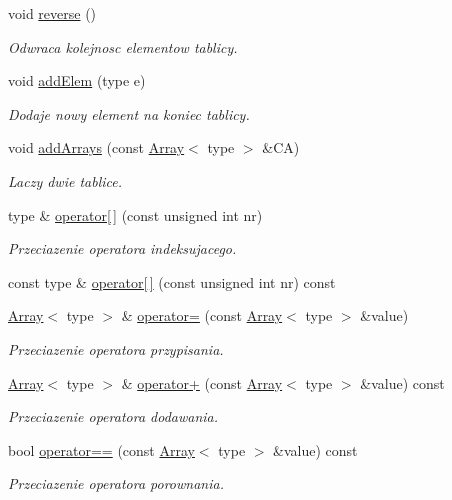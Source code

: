 \begin{DoxyCompactItemize}
void \hyperlink{class_array_afdcea945751f954e5d978f3845939bd4}{reverse} ()
\begin{DoxyCompactList}\small\item\em Odwraca kolejnosc elementow tablicy. \end{DoxyCompactList}\item 
void \hyperlink{class_array_ad57a599a8ff2c1d502ef8d7d309cc316}{add\-Elem} (type e)
\begin{DoxyCompactList}\small\item\em Dodaje nowy element na koniec tablicy. \end{DoxyCompactList}\item 
void \hyperlink{class_array_aa9091edbef604b69bb919908ff5d25f2}{add\-Arrays} (const \hyperlink{class_array}{Array}$<$ type $>$ \&C\-A)
\begin{DoxyCompactList}\small\item\em Laczy dwie tablice. \end{DoxyCompactList}\item 
type \& \hyperlink{class_array_aaffe48273ef363811e4281d3c98f54ab}{operator\mbox{[}$\,$\mbox{]}} (const unsigned int nr)
\begin{DoxyCompactList}\small\item\em Przeciazenie operatora indeksujacego. \end{DoxyCompactList}\item 
const type \& \hyperlink{class_array_a35b84fdc5667252256427106e0df873d}{operator\mbox{[}$\,$\mbox{]}} (const unsigned int nr) const 
\item 
\hyperlink{class_array}{Array}$<$ type $>$ \& \hyperlink{class_array_a264035df373bcf3e05339511a7252897}{operator=} (const \hyperlink{class_array}{Array}$<$ type $>$ \&value)
\begin{DoxyCompactList}\small\item\em Przeciazenie operatora przypisania. \end{DoxyCompactList}\item 
\hyperlink{class_array}{Array}$<$ type $>$ \& \hyperlink{class_array_a6a1a5e53b3e1774c118667216f4134b8}{operator+} (const \hyperlink{class_array}{Array}$<$ type $>$ \&value) const 
\begin{DoxyCompactList}\small\item\em Przeciazenie operatora dodawania. \end{DoxyCompactList}\item 
bool \hyperlink{class_array_ad52b3c353c90ed68e9d5be7b5c4b04b4}{operator==} (const \hyperlink{class_array}{Array}$<$ type $>$ \&value) const 
\begin{DoxyCompactList}\small\item\em Przeciazenie operatora porownania. \end{DoxyCompactList}\end{DoxyCompactItemize}
